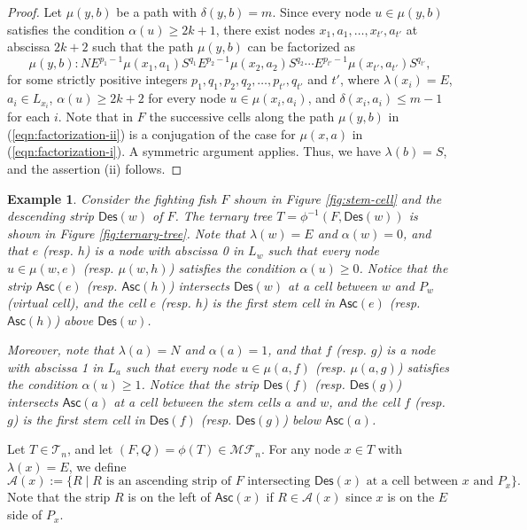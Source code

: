 \documentclass[a4paper,11pt,reqno]{amsart}
\newtheorem{exa}[lem]{Example}
\theoremstyle{definition}
\numberwithin{equation}{section}
\newcommand{\A}{{\mathcal{A}}}
\newcommand{\Des}{{\textsf{Des}}}
\newcommand{\Asc}{{\textsf{Asc}}}
\newcommand{\MF}{{\mathcal{MF}}}
\newcommand{\T}{{\mathcal{T}}}
\begin{document}
\begin{proof}
Let $\mu(y,b)$ be a path with $\delta(y,b)=m$. Since every node $u\in\mu(y,b)$ satisfies the condition $\alpha(u)\ge 2k+1$, there exist nodes $x_1, a_1, \dots, x_{t'}, a_{t'}$ at abscissa $2k+2$ such that the path $\mu(y,b)$ can be factorized as
\begin{equation} \label{eqn:factorization-ii}
\mu(y,b): NE^{p_1-1}\mu(x_1,a_1)S^{q_1}E^{p_2-1}\mu(x_2,a_2)S^{q_2}\cdots E^{p_{t'}-1}\mu(x_{t'},a_{t'})S^{q_{t'}},
\end{equation}
for some strictly positive integers $p_1,q_1,p_2,q_2,\dots,p_{t'},q_{t'}$ and $t'$, where $\lambda(x_i)=E$, $a_i\in L_{x_i}$, $\alpha(u)\ge 2k+2$ for every node $u\in\mu(x_i,a_i)$, and $\delta(x_i,a_i)\le m-1$ for each $i$. Note that in $F$ the successive cells along the path $\mu(y,b)$ in (\ref{eqn:factorization-ii}) is a conjugation of the case for $\mu(x,a)$ in (\ref{eqn:factorization-i}). A symmetric argument applies. Thus, we have $\lambda(b)=S$, and the assertion (ii) follows.
\end{proof}

\begin{exa} {\rm
Consider the fighting fish $F$ shown in Figure \ref{fig:stem-cell} and the descending strip $\Des(w)$ of $F$. The ternary tree $T=\phi^{-1}(F,\Des(w))$ is shown in Figure \ref{fig:ternary-tree}. Note that $\lambda(w)=E$ and $\alpha(w)=0$, and that $e$ (resp. $h$) is a node with abscissa 0 in $L_w$ such that every node $u\in\mu(w,e)$ (resp. $\mu(w,h)$) satisfies the condition $\alpha(u)\ge 0$. Notice that the strip $\Asc(e)$ (resp. $\Asc(h)$) intersects $\Des(w)$ at a cell between  $w$ and $P_w$ (virtual cell), and the cell $e$ (resp. $h$) is the first stem cell in $\Asc(e)$ (resp. $\Asc(h)$) above $\Des(w)$. 

Moreover, note that $\lambda(a)=N$ and $\alpha(a)=1$, and that $f$ (resp. $g$) is a node with abscissa 1 in $L_a$ such that every node $u\in\mu(a,f)$ (resp. $\mu(a,g)$) satisfies the condition $\alpha(u)\ge 1$. Notice that the strip $\Des(f)$ (resp. $\Des(g)$) intersects $\Asc(a)$ at a cell between the stem cells $a$ and $w$, and the cell $f$ (resp. $g$) is the first stem cell in $\Des(f)$ (resp. $\Des(g)$) below $\Asc(a)$.
}
\end{exa}

Let $T\in\T_n$, and let $(F,Q)=\phi(T)\in\MF_n$. For any node $x\in T$ with $\lambda(x)=E$, we define
\begin{equation*} 
\A(x) := \{R\mid \mbox{$R$ is an ascending strip of $F$ intersecting $\Des(x)$ at a cell between $x$ and $P_x$}\}.
\end{equation*}
Note that the strip $R$ is on the left of $\Asc(x)$ if $R\in\A(x)$ since $x$ is on the $E$ side of $P_x$.
\end{document}

